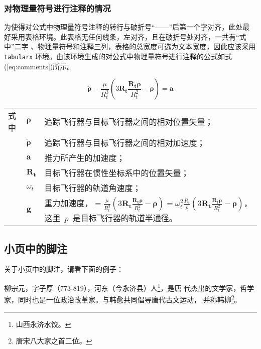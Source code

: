 \subsubsection{对物理量符号进行注释的情况}

为使得对公式中物理量符号注释的转行与破折号“——”后第一个字对齐，此处最
好采用表格环境。此表格无任何线条，左对齐，且在破折号处对齐，一共有“式中”二字
、物理量符号和注释三列，表格的总宽度可选为文本宽度，因此应该采用
\texttt{tabularx} 环境。由该环境生成的对公式中物理量符号进行注释的公式如式
(\ref{eq:comments})所示。

\begin{equation}
\label{eq:comments}
\ddot{\symbf{\rho}}-\frac{\mu}{R_t^3}\left(3\symbf{R_t}\frac{\symbf{R_t\rho}}{R_t^2}-\symbf{\rho}\right)=\symbf{a}
\end{equation}
\begin{flushleft}
\renewcommand\arraystretch{1.25}
\begin{tabularx}{\textwidth}{@{}>{\normalsize\rm}l@{\quad}>{\normalsize\rm}l@{——}>{\normalsize\rm}X@{}}
式中& $\symbf{\rho}$ &追踪飞行器与目标飞行器之间的相对位置矢量；\\
&  $\ddot{\symbf{\rho}}$&追踪飞行器与目标飞行器之间的相对加速度；\\
&  $\symbf{a}$   &推力所产生的加速度；\\
&  $\symbf{R_t}$ & 目标飞行器在惯性坐标系中的位置矢量；\\
&  $\omega_{t}$ & 目标飞行器的轨道角速度；\\
&  $\symbf{g}$ & 重力加速度，$=\frac{\mu}{R_{t}^{3}}\left(
3\symbf{R_{t}}\frac{\symbf{R_{t}\rho}}{R_{t}^{2}}-\symbf{\rho}\right)=\omega_{t}^{2}\frac{R_{t}}{p}\left(
3\symbf{R_{t}}\frac{\symbf{R_{t}\rho}}{R_{t}^{2}}-\symbf{\rho}\right)$，这里~$p$~是目标飞行器的轨道半通径。
\end{tabularx}\vspace{.5ex}%
\end{flushleft}

\subsection{小页中的脚注}

关于小页中的脚注，请看下面的例子：
 
\begin{minipage}[t]{\linewidth-\parindent}
柳宗元，字子厚（773-819），河东（今永济县）人\footnote{山西永济水饺。}，是唐
代杰出的文学家，哲学家，同时也是一位政治改革家。与韩愈共同倡导唐代古文运动，
并称韩柳\footnote{唐宋八大家之首二位。}。
\end{minipage}


